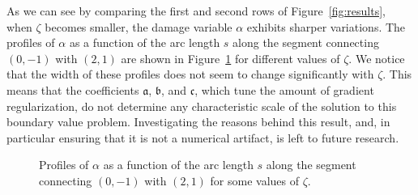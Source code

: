 \documentclass[a4paper,10pt,oneside]{amsbook}
\numberwithin{section}{chapter}
\numberwithin{equation}{chapter}
\theoremstyle{definition}
\begin{document}
As we can see by comparing the first and second rows of Figure~\ref{fig:results}, when $\zeta$ becomes smaller, the damage variable $\alpha$ exhibits sharper variations. The profiles of $\alpha$ as a function of the arc length $s$ along the segment connecting $(0,-1)$ with $(2,1)$ are shown in Figure~\ref{fig:shear-band} for different values of $\zeta$. We notice that the width of these profiles does not seem to change significantly with $\zeta$. This means that the coefficients $\mathfrak{a}$, $\mathfrak{b}$, and $\mathfrak{c}$, which tune the amount of gradient regularization, do not determine any characteristic scale of the solution to this boundary value problem. Investigating the reasons behind this result, and, in particular ensuring that it is not a numerical artifact, is left to future research.
\begin{figure}
\caption{Profiles of $\alpha$ as a function of the arc length $s$ along the segment connecting $(0,-1)$ with $(2,1)$ for some values of $\zeta$.}
\label{fig:shear-band}
\end{figure}
\end{document}
